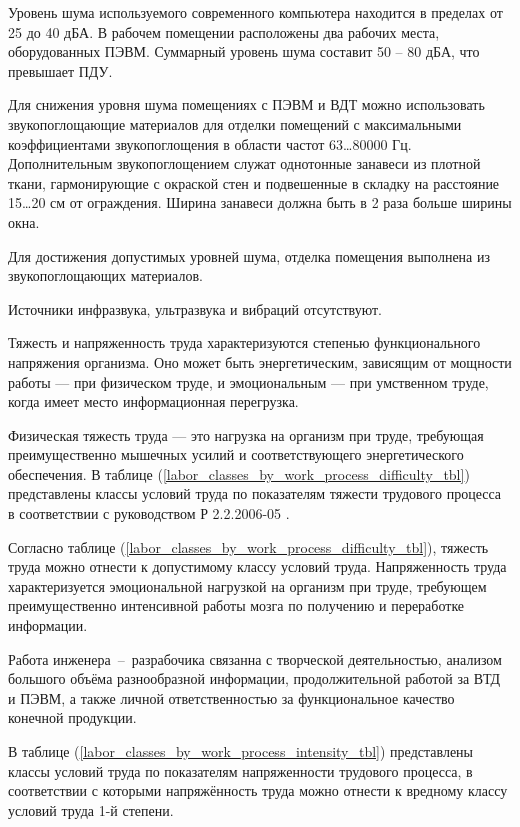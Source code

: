 Уровень шума используемого современного компьютера находится в пределах от 25 до
40 дБА. В рабочем помещении расположены два рабочих места, оборудованных ПЭВМ.
Суммарный уровень шума составит 50 – 80 дБА, что превышает ПДУ.

Для снижения уровня шума помещениях с ПЭВМ и ВДТ можно использовать звукопоглощающие
материалов для отделки помещений с максимальными коэффициентами звукопоглощения
в области частот 63…80000 Гц. Дополнительным звукопоглощением служат однотонные
занавеси из плотной ткани, гармонирующие с окраской стен и подвешенные в складку
на расстояние 15…20 см от ограждения. Ширина занавеси должна быть в 2 раза больше
ширины окна.

Для достижения допустимых уровней шума, отделка помещения выполнена из
звукопоглощающих материалов.

Источники инфразвука, ультразвука и вибраций отсутствуют.


Тяжесть и напряженность труда характеризуются степенью функционального напряжения
организма. Оно может быть энергетическим, зависящим от мощности работы --- при
физическом труде, и эмоциональным --- при умственном труде, когда имеет место
информационная перегрузка.

Физическая тяжесть труда --- это нагрузка на организм при труде, требующая
преимущественно мышечных усилий и соответствующего энергетического обеспечения.
В таблице (\ref{labor_classes_by_work_process_difficulty_tbl}) представлены классы
условий труда по показателям тяжести трудового процесса в соответствии с
руководством Р 2.2.2006-05 \cite{ecology_man_2_2_2006_05}.




Согласно таблице (\ref{labor_classes_by_work_process_difficulty_tbl}), тяжесть
труда можно отнести к допустимому классу условий труда. Напряженность труда
характеризуется эмоциональной нагрузкой на организм при труде, требующем
преимущественно интенсивной работы мозга по получению и переработке информации.

Работа инженера~--~разрабочика связанна с творческой деятельностью, анализом большого
объёма разнообразной информации, продолжительной работой за ВТД и ПЭВМ, а также
личной ответственностью за функциональное качество конечной продукции.

В таблице (\ref{labor_classes_by_work_process_intensity_tbl}) представлены классы
условий труда по показателям напряженности трудового процесса, в соответствии с
которыми напряжённость труда можно отнести к вредному классу условий труда 1-й
степени.

